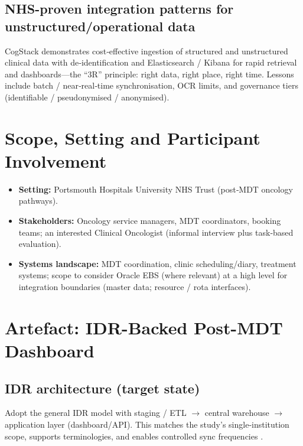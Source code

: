 \documentclass[12pt, a4paper, twoside]{article} %
\begin{document}
\subsection{NHS-proven integration patterns for unstructured/operational data}

CogStack \citep{jackson2018} demonstrates cost‑effective ingestion of structured and unstructured clinical data with de‑identification and Elasticsearch / Kibana for rapid retrieval and dashboards—the “3R” principle: right data, right place, right time. Lessons include batch / near‑real‑time synchronisation, OCR limits, and governance tiers (identifiable / pseudonymised / anonymised).

\section{Scope, Setting and Participant Involvement}

\begin{itemize}
  \item \textbf{Setting:} Portsmouth Hospitals University NHS Trust (post‑MDT oncology pathways).
  \item \textbf{Stakeholders:} Oncology service managers, MDT coordinators, booking teams; an interested Clinical Oncologist (informal interview plus task‑based evaluation).
  \item \textbf{Systems landscape:} MDT coordination, clinic scheduling/diary, treatment systems; scope to consider Oracle EBS (where relevant) at a high level for integration boundaries (master data; resource / rota interfaces).
\end{itemize}

\section{Artefact: IDR-Backed Post-MDT Dashboard}

\subsection{IDR architecture (target state)}

Adopt the general IDR model with staging / ETL $\rightarrow$ central warehouse $\rightarrow$ application layer (dashboard/API). This matches the study’s single‑institution scope, supports terminologies, and enables controlled sync frequencies \citep{gagalova2020}.
\end{document}
